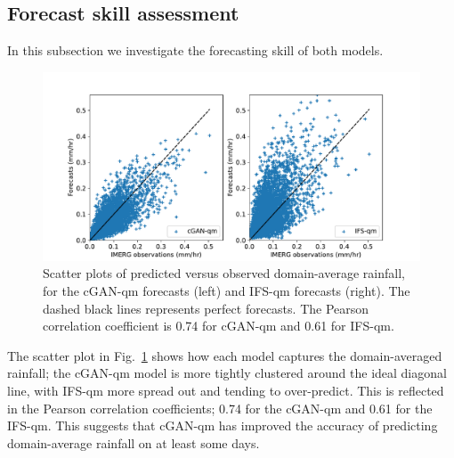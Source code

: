 \documentclass{article}
\begin{document}
\subsection{Forecast skill assessment}
\label{sec:fcst_skill}

In this subsection we investigate the forecasting skill of both models. 

\begin{figure}
\centering

    \centering
     \includegraphics[width=\textwidth]{images/scatter_mean_final-nologs_217600.pdf}
     \caption{Scatter plots of predicted versus observed domain-average rainfall, for the cGAN-qm forecasts (left) and IFS-qm forecasts (right). The dashed black lines represents perfect forecasts. The Pearson correlation coefficient is 0.74 for cGAN-qm and 0.61 for IFS-qm.}
     \label{fig:scatter}
\end{figure}

The scatter plot in Fig.~\ref{fig:scatter} shows how each model captures the domain-averaged rainfall; the cGAN-qm model is more tightly clustered around the ideal diagonal line, with IFS-qm more spread out and tending to over-predict. This is reflected in the Pearson correlation coefficients; 0.74 for the cGAN-qm and 0.61 for the IFS-qm. This suggests that cGAN-qm has improved the accuracy of predicting domain-average rainfall on at least some days.
\end{document}
